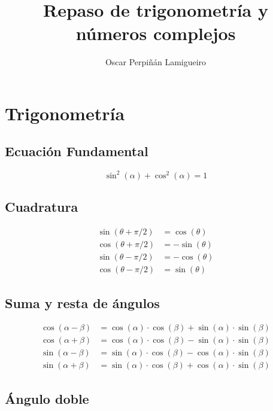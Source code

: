 \documentclass[article, a4paper]{memoir}
\author{Oscar Perpiñán Lamigueiro}
\date{}
\title{Repaso de trigonometría y números complejos}
\begin{document}
\maketitle

\section{Trigonometría}

\subsection{Ecuación Fundamental}

\begin{equation*}
  \sin^2(\alpha) + \cos^2(\alpha) = 1
\end{equation*}

\subsection{Cuadratura}

\begin{align*}
  \sin(\theta + \pi/2) &= \cos(\theta)\\
  \cos(\theta + \pi/2) &= -\sin(\theta)\\
  \sin(\theta - \pi/2) &= -\cos(\theta)\\
  \cos(\theta - \pi/2) &= \sin(\theta)
\end{align*}

\subsection{Suma y resta de ángulos}

\begin{align*}
  \cos(\alpha - \beta) &= \cos(\alpha) \cdot \cos(\beta) + \sin(\alpha) \cdot \sin(\beta)\\
  \cos(\alpha + \beta) &= \cos(\alpha) \cdot \cos(\beta) - \sin(\alpha) \cdot \sin(\beta)\\
  \sin(\alpha - \beta) &= \sin(\alpha) \cdot \cos(\beta) - \cos(\alpha) \cdot \sin(\beta)\\
  \sin(\alpha + \beta) &= \sin(\alpha) \cdot \cos(\beta) + \cos(\alpha) \cdot \sin(\beta)
\end{align*}

\subsection{Ángulo doble}
\end{document}
